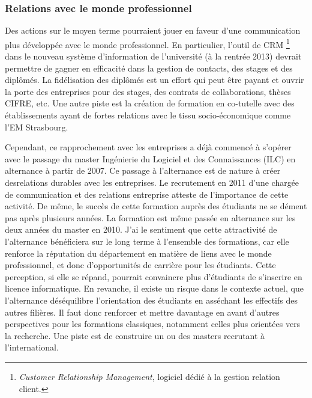 \documentclass[11pt]{article}
\begin{document}

\subsubsection{Relations avec le monde professionnel}

Des actions sur le moyen terme pourraient jouer en faveur d'une communication 
plus développée avec le monde professionnel. En particulier, l'outil de CRM%
\footnote{\textit{Customer Relationship Management}, logiciel dédié à la 
gestion relation client.}
dans le nouveau système d'information de l'université (à la rentrée 2013) 
devrait permettre de gagner en efficacité dans la gestion de contacts, des 
stages et des diplômés. La fidélisation des diplômés est un effort qui peut 
être payant et ouvrir la porte des entreprises pour des stages, des contrats 
de collaborations, thèses CIFRE, etc. Une autre piste est la création de 
formation en co-tutelle avec des établissements ayant de fortes relations avec
le tissu socio-économique comme l'EM Strasbourg.

Cependant, ce rapprochement avec les entreprises a déjà commencé à s'opérer 
avec le passage du master Ingénierie du Logiciel et des Connaissances (ILC) en 
alternance à partir de 2007. Ce passage à l'alternance est de nature à créer 
desrelations durables avec les entreprises. Le recrutement en 2011 d'une 
chargée de communication et des relations entreprise atteste de l'importance de 
cette activité. De même, le succès de cette formation auprès des étudiants ne 
se dément pas après plusieurs années. La formation est même passée en 
alternance sur les deux années du master en 2010. J'ai le sentiment que cette 
attractivité de l'alternance bénéficiera sur le long terme à l'ensemble des 
formations, car elle renforce la réputation du département en matière de liens 
avec le monde professionnel, et donc d'opportunités de carrière pour les 
étudiants. Cette perception, si elle se répand, pourrait convaincre plus 
d'étudiants de s'inscrire en licence informatique. En revanche, il existe un 
risque dans le contexte actuel, que l'alternance déséquilibre l'orientation des 
étudiants en asséchant les effectifs des autres filières. Il faut donc 
renforcer et mettre davantage en avant d'autres perspectives pour les 
formations classiques, notamment celles plus orientées vers la recherche. 
Une piste est de construire un ou des masters recrutant à l'international.
\end{document}
